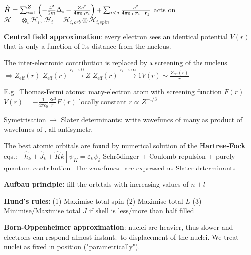 \begin{squishlist}
    \item $\hat{H} = \sum_{i=1}^{Z}\left( - \frac{\hbar^2}{2m}\Delta_i - \frac{Ze^2}{4\pi \varepsilon_0 r_i}\right) + \sum_{i < j} \frac{e^2}{4\pi \varepsilon_0 |\bm{r}_i - \bm{r}_j}$ 
    acts on $\mathcal{H} = \otimes_i \mathcal{H}_i,\, \mathcal{H}_i =  \mathcal{H}_{i, orb} \otimes \mathcal{H}_{i, spin}$
    \item \textbf{Central field approximation}: every electron sees an identical potential $V(r)$ that is only a function of its distance from the nucleus.
    
    \item The inter-electronic contribution is replaced by a screening of the nucleus  \\ $\Longrightarrow Z_{\mathrm{eff}}(r)$ \quad $Z_{\mathrm{eff}}(r) \overset{r_i\rightarrow 0}{\rightarrow} Z$ \quad $Z_{\mathrm{eff}}(r) \overset{r_i\rightarrow \infty}{\rightarrow} 1$\quad $V(r) \sim \frac{Z_{\mathrm{eff}}(r)}{r}$
    \item E.g.\ Thomas-Fermi atoms: many-electron atom with screening function $F(r)$ \\
    $V(r) = -\frac{1}{4 \pi \varepsilon_0} \frac{Z e^2}{r} F(r)$ locally constant \qquad
    $r \propto Z^{-1/3}$
    \item Symetrisation $\rightarrow$ Slater determinants: write wavefuncs of many \elec as product of wavefuncs of \elec, all antisymetr.
    \item The best atomic orbitals are found by numerical solution of the \textbf{Hartree-Fock} eqs.:
    $\left[\hat{h}_k + \hat{J}_k + \hat{K}k\right]\psi_K = \varepsilon_k \psi_k$ \quad
    Schrödinger + Coulomb repulsion + purely quantum contribution.
    The wavefuncs.\ are expressed as Slater determinants.

    \item \textbf{Aufbau principle:} fill the orbitals with increasing values of $n+l$
    \item \textbf{Hund's rules:} (1) Maximise total spin (2) Maximise total $L$ (3) Minimise/Maximise total $J$ if shell is less/more than half filled
\end{squishlist}

\textbf{Born-Oppenheimer approximation}: nuclei are heavier, thus slower and electrons can respond almost instant.\ to displacement of the nuclei. We treat nuclei as fixed in position ("parametrically").

